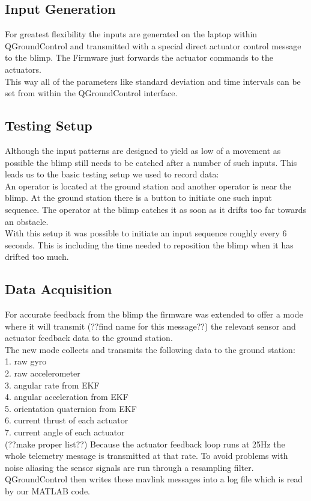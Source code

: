 \subsection{Input Generation}
\label{sub:input_generation}
For greatest flexibility the inputs are generated on the laptop within QGroundControl and transmitted with a special direct actuator control message to the blimp. The Firmware just forwards the actuator commands to the actuators. \\
This way all of the parameters like standard deviation and time intervals can be set from within the QGroundControl interface.\\

\subsection{Testing Setup}
\label{sub:testing_setup}
Although the input patterns are designed to yield as low of a movement as possible the blimp still needs to be catched after a number of such inputs. This leads us to the basic testing setup we used to record data: \\
An operator is located at the ground station and another operator is near the blimp.
At the ground station there is a button to initiate one such input sequence.
The operator at the blimp catches it as soon as it drifts too far towards an obstacle. \\
With this setup it was possible to initiate an input sequence roughly every 6 seconds. 
This is including the time needed to reposition the blimp when it has drifted too much.

\subsection{Data Acquisition}
\label{sub:data_acquisition}
For accurate feedback from the blimp the firmware was extended to offer a mode where it will transmit (??find name for this message??) the relevant sensor and actuator feedback data to the ground station. \\
The new mode collects and transmits the following data to the ground station:\\
1. raw gyro\\
2. raw accelerometer\\
3. angular rate from EKF\\
4. angular acceleration from EKF\\
5. orientation quaternion from EKF\\
6. current thrust of each actuator\\
7. current angle of each actuator\\
(??make proper list??)
Because the actuator feedback loop runs at 25Hz the whole telemetry message is transmitted at that rate.
To avoid problems with noise aliasing the sensor signals are run through a resampling filter. \\
QGroundControl then writes these mavlink messages into a log file which is read by our MATLAB code.

